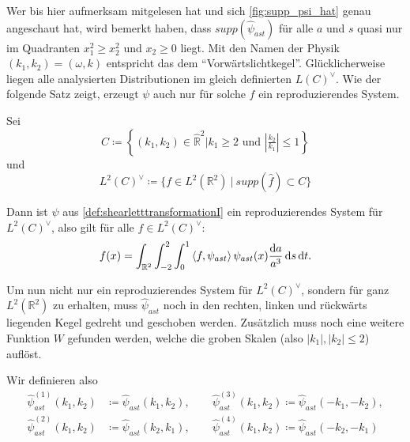 Wer bis hier aufmerksam mitgelesen hat und sich \cref{fig:supp_psi_hat} genau angeschaut hat, wird bemerkt haben, dass $supp(\hat\psi_{ast})$ für alle $a$ und $s$ quasi nur im Quadranten $x_1^2 \geq x_2^2$ und $x_2 \geq 0$ liegt.
Mit den Namen der Physik $(k_1, k_2) = (\omega, k)$ entspricht das dem "`Vorwärtslichtkegel"'. Glücklicherweise liegen alle analysierten Distributionen im gleich definierten $L(C)^\vee$.
Wie der folgende Satz zeigt, erzeugt $\psi$ auch nur für solche $f$ ein reproduzierendes System.

\begin{theorem}
\label{thm:shearlets_reproduzieren}
    Sei
    \begin{equation*}
        C \coloneqq \left\{(k_1,k_2)\in \hat{\mathbb{R}}^2
        \Big| k_1 \geq 2 \textrm{ und } \left\lvert\tfrac{k_2}{k_1}\right\rvert \leq 1
        \right\}
    \end{equation*}
    und
    \begin{equation}
        L^2(C)^\vee \coloneqq \{f \in L^2(\mathbb{R}^2) ~|~ supp (\hat f) \subset C\}
        \label{eq:L2_cone}
    \end{equation}

    Dann ist $\psi$ aus \cref{def:shearletttransformationI} ein reproduzierendes System für $L^2(C)^\vee$, also gilt für alle
    $f \in L^2(C)^\vee$:
    \begin{equation}
        f(x) = \int_{\mathbb{R}^2} \int_{-2}^2 \int_0^1
                \left\langle f,\psi_{ast}\right\rangle \psi_{ast}(x)
                \frac{\mathop{}\!\mathrm{d} a}{a^3} \mathop{}\!\mathrm{d} s \mathop{}\!\mathrm{d} t.
    \end{equation}
\end{theorem}

Um nun nicht nur ein reproduzierendes System für $L^2(C)^\vee$, sondern für ganz $L^2(\mathbb{R}^2)$ zu erhalten, muss $\hat \psi_{ast}$ noch in den rechten, linken und rückwärts liegenden Kegel gedreht und geschoben werden. Zusätzlich muss noch eine weitere Funktion $W$ gefunden werden, welche die groben Skalen (also $|k_1|, |k_2| \leq 2$) auflöst.


Wir definieren also
\begin{align}
    \hat \psi_{ast}^{(1)} (k_1, k_2) &\coloneqq \hat\psi_{ast} (k_1,k_2),
    \qquad
    \hat\psi_{ast}^{(3)}(k_1,k_2) \coloneqq \hat\psi_{ast} (-k_1,-k_2),
    \nonumber\\
    \hat \psi_{ast}^{(2)} (k_1, k_2) &\coloneqq \hat\psi_{ast} (k_2,k_1),
    \qquad
    \hat\psi_{ast}^{(4)}(k_1, k_2) \coloneqq \hat\psi_{ast} (-k_2,-k_1)
    \label{eq:psi(i)}
\end{align}

